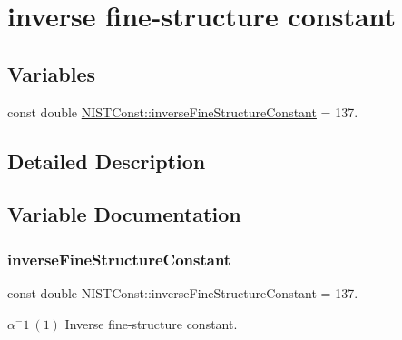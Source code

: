 \hypertarget{group___inverse_fine_structure_constant}{}\section{inverse fine-\/structure constant}
\label{group___inverse_fine_structure_constant}
\subsection*{Variables}
\begin{DoxyCompactItemize}
\item 
const double \hyperlink{group___inverse_fine_structure_constant_gaa4cd257f5376577cf0331e71dd952bb6}{N\+I\+S\+T\+Const\+::inverse\+Fine\+Structure\+Constant} = 137.
\end{DoxyCompactItemize}


\subsection{Detailed Description}


\subsection{Variable Documentation}
\mbox{\label{group___inverse_fine_structure_constant_gaa4cd257f5376577cf0331e71dd952bb6}} 
\subsubsection{\texorpdfstring{inverse\+Fine\+Structure\+Constant}{inverseFineStructureConstant}}
{\footnotesize\ttfamily const double N\+I\+S\+T\+Const\+::inverse\+Fine\+Structure\+Constant = 137.}

$\alpha^-1 \ (1)$ Inverse fine-\/structure constant. 